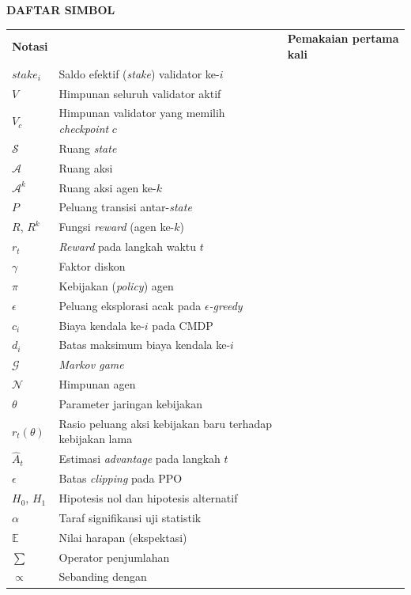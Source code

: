 \cleardoublepage
\vspace{2cm}
\begin{center}
{\fontsize{14}{16.8}\selectfont\textbf{DAFTAR SIMBOL}}\\[1em]
\end{center}
\label{chap:simbol}
\setcounter{chapter}{0}
\setcounter{section}{0}
\vspace{2em}

\begin{longtable}{@{} l >{\raggedright\arraybackslash}p{6.5cm} c @{}}
\multicolumn{1}{l}{\textbf{Notasi}} & \multicolumn{1}{l}{\textbf{Deskripsi}} & \multicolumn{1}{l}{\parbox[c]{3.5cm}{\raggedright \textbf{Pemakaian pertama kali}}} \\

$\textit{stake}_i$ & Saldo efektif (\textit{stake}) validator ke-$i$ & \\
$V$ & Himpunan seluruh validator aktif & \\
$V_c$ & Himpunan validator yang memilih \textit{checkpoint} $c$ & \\[1ex]

$\mathcal{S}$ & Ruang \textit{state} & \\
$\mathcal{A}$ & Ruang aksi & \\
$\mathcal{A}^{k}$ & Ruang aksi agen ke-$k$ & \\
$P$ & Peluang transisi antar-\textit{state} & \\
$R$, $R^{k}$ & Fungsi \textit{reward} (agen ke-$k$) & \\
$r_t$ & \textit{Reward} pada langkah waktu $t$ & \\
$\gamma$ & Faktor diskon & \\
$\pi$ & Kebijakan (\textit{policy}) agen & \\
$\epsilon$ & Peluang eksplorasi acak pada \textit{$\epsilon$-greedy} & \\
$c_i$ & Biaya kendala ke-$i$ pada CMDP & \\
$d_i$ & Batas maksimum biaya kendala ke-$i$ & \\
$\mathcal{G}$ & \textit{Markov game} & \\
$\mathcal{N}$ & Himpunan agen & \\
$\theta$ & Parameter jaringan kebijakan & \\
$r_t(\theta)$ & Rasio peluang aksi kebijakan baru terhadap kebijakan lama & \\
$\hat{A}_t$ & Estimasi \textit{advantage} pada langkah $t$ & \\
$\epsilon$ & Batas \textit{clipping} pada PPO & \\[1ex]

$H_0$, $H_1$ & Hipotesis nol dan hipotesis alternatif & \\
$\alpha$ & Taraf signifikansi uji statistik & \\
$\mathbb{E}$ & Nilai harapan (ekspektasi) & \\
$\sum$ & Operator penjumlahan & \\
$\propto$ & Sebanding dengan & \\

\end{longtable}